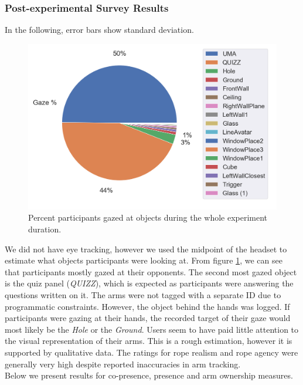 \clearpage

\subsubsection{Post-experimental Survey Results}

In the following, error bars show standard deviation.
\begin{figure}[H]
 \centering
 \includegraphics[scale=0.5]{Files/Plots/gaze_plots.png}
 \caption{Percent participants gazed at objects during the whole experiment duration. }
\label{fig:gazePie}
\end{figure}
We did not have eye tracking, however we used the midpoint of the headset to estimate what objects participants were looking at. From figure \ref{fig:gazePie}, we can see that participants mostly gazed at their opponents. The second most gazed object is the quiz panel (\textit{QUIZZ}), which is expected as participants were answering the questions written on it.  The arms were not tagged with a separate ID due to programmatic constraints. However, the object behind the hands was logged. If participants were gazing at their hands, the recorded target of their gaze would most likely be the \textit{Hole} or the \textit{Ground}. Users seem to have paid little attention to the visual representation of their arms. This is a rough estimation, however it is supported by qualitative data. The ratings for rope realism and rope agency were generally very high despite reported inaccuracies in arm tracking.\\ 
Below we present results for co-presence, presence and arm ownership measures. 

